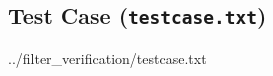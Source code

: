 \documentclass[12pt]{article}
\newcommand{\TextListing}{}
\begin{document}
\subsection{Test Case (\texttt{testcase.txt})}
\label{lst:testcase.txt}
\TextListing{../filter_verification/testcase.txt}






\fi
\end{document}
